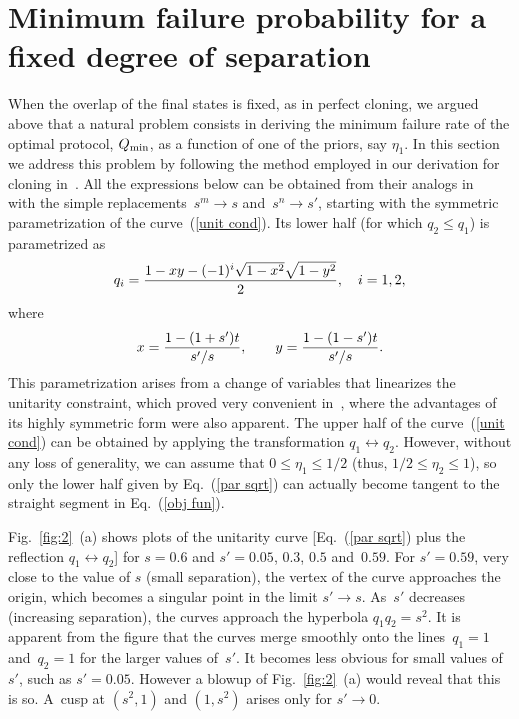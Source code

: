\documentclass[aps,pra,twocolumn,showpacs]{revtex4-1}
\begin{document}
{\section{Minimum failure probability for a fixed degree of separation}\label{Q(eta)}

When the overlap of the final states is fixed, as in perfect cloning, we argued above that a natural problem consists in deriving the minimum failure rate of the optimal protocol, $Q_{\rm min}$, as a function of one of the priors, say $\eta_1$. In this section we address this problem by following the method employed in our derivation for cloning  in~\cite{us1}. All the expressions below can be obtained from their analogs in~\cite{us1} with the simple replacements~$s^m\to s$ and~$s^n\to s'$, starting with
the symmetric parametrization of the curve~(\ref{unit cond}). Its lower half (for which $q_2\le q_1$) is parametrized as
%
\begin{equation}
q_i={1-xy-(-1)^i\sqrt{1-x^2}\sqrt{1-y^2}\over2} ,\quad i=1,2,
\label{par sqrt}
\end{equation}
where
%
\begin{equation}
x={1-(1+s')t\over s'/s},\qquad y={1-(1-s')t \over s'/s}.
\label{x & y}
\end{equation}
%
This parametrization arises from a change of variables that linearizes the unitarity constraint, which proved very convenient in~\cite{us1}, where the advantages of its highly symmetric form were also apparent. The upper half of the curve~(\ref{unit cond}) can be obtained by applying the transformation $q_1\leftrightarrow q_2$. However, without any loss of generality, we can assume that $0\le \eta_1\le 1/2$  (thus, $1/2\le\eta_2\le1$), so only the lower half given by Eq.~(\ref{par sqrt}) can actually become tangent to the straight segment in Eq.~(\ref{obj fun}). 

Fig.~\ref{fig:2}~(a) shows plots of the unitarity curve [Eq.~(\ref{par sqrt}) plus the reflection $q_1\leftrightarrow q_2$] for $s=0.6$ and $s'=0.05$, $0.3$, $0.5$ and~$0.59$. For $s'=0.59$, very close to the value of $s$ (small separation), the vertex of the curve approaches the origin, which becomes a singular point in the limit \mbox{$s'\to s$}. As~$s'$ decreases (increasing separation), the curves approach the hyperbola $q_1 q_2=s^2$. It is apparent from the figure that the curves merge smoothly onto the lines~$q_1=1$ and~$q_2=1$ for the larger values of~$s'$. It becomes less obvious for small values of~$s'$, such as $s'=0.05$. However a blowup of Fig.~\ref{fig:2}~(a) would reveal that this is so. A~cusp at $(s^2,1)$ and $(1,s^2)$ arises only for $s'\to0$.
%

}
\end{document}

